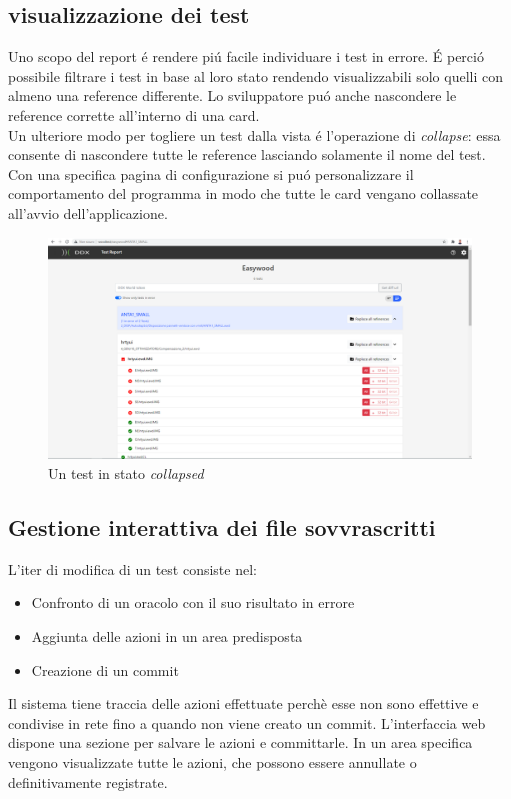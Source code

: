         \subsection{visualizzazione dei test}        
            Uno scopo del report \'e rendere pi\'u facile individuare i test in errore.
            \'E perci\'o possibile filtrare i test in base al loro stato rendendo visualizzabili solo quelli con almeno una reference differente.
            Lo sviluppatore pu\'o anche nascondere le reference corrette all'interno di una card.\\
            Un ulteriore modo per togliere un test dalla vista \'e l'operazione di \textit{collapse}: essa consente di nascondere tutte le reference lasciando solamente il nome del test.
            Con una specifica pagina di configurazione si pu\'o personalizzare il comportamento del programma in modo che tutte le card vengano collassate all'avvio dell'applicazione.
            
            \begin{figure}[h]
                \includegraphics[width=\textwidth]{images/collpapsed.png}
                \caption{Un test in stato \textit{collapsed}}
            \end{figure}
            
            \subsection{Gestione interattiva dei file sovvrascritti}
            L'iter di modifica di un test consiste nel: 
            \begin{itemize}
                \item Confronto di un oracolo con il suo risultato in errore
                \item Aggiunta delle azioni in un area predisposta
                \item Creazione di un commit
            \end{itemize}      
            Il sistema tiene traccia delle azioni effettuate perchè esse non sono effettive e condivise in rete fino a quando non viene creato un commit.
            L'interfaccia web dispone una sezione per salvare le azioni e committarle.
            In un area specifica vengono visualizzate tutte le azioni, che possono essere annullate o definitivamente registrate.
